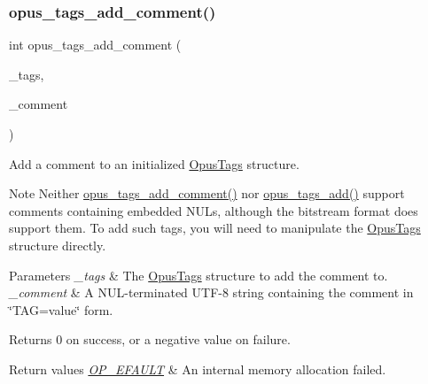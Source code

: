 \subsubsection{\texorpdfstring{opus\+\_\+tags\+\_\+add\+\_\+comment()}{opus\_tags\_add\_comment()}}
{\footnotesize\ttfamily int opus\+\_\+tags\+\_\+add\+\_\+comment (\begin{DoxyParamCaption}\item[{\hyperlink{struct_opus_tags}{Opus\+Tags} $\ast$}]{\+\_\+tags,  }\item[{\hyperlink{zconf_8h_a2c212835823e3c54a8ab6d95c652660e}{const} char $\ast$}]{\+\_\+comment }\end{DoxyParamCaption})}

Add a comment to an initialized \hyperlink{struct_opus_tags}{Opus\+Tags} structure. \begin{DoxyNote}{Note}
Neither \hyperlink{group__header__info_ga76ac5425d8c2ca9a994f84adfcc6cb98}{opus\+\_\+tags\+\_\+add\+\_\+comment()} nor \hyperlink{group__header__info_ga42bc0321740b618271c4cd0ae076d29a}{opus\+\_\+tags\+\_\+add()} support comments containing embedded N\+U\+Ls, although the bitstream format does support them. To add such tags, you will need to manipulate the \hyperlink{struct_opus_tags}{Opus\+Tags} structure directly. 
\end{DoxyNote}

\begin{DoxyParams}{Parameters}
{\em \+\_\+tags} & The \hyperlink{struct_opus_tags}{Opus\+Tags} structure to add the comment to. \\
\hline
{\em \+\_\+comment} & A N\+U\+L-\/terminated U\+T\+F-\/8 string containing the comment in \char`\"{}\+T\+A\+G=value\char`\"{} form. \\
\hline
\end{DoxyParams}
\begin{DoxyReturn}{Returns}
0 on success, or a negative value on failure. 
\end{DoxyReturn}

\begin{DoxyRetVals}{Return values}
{\em \hyperlink{group__error__codes_ga2ddb887c0bb55c74ea6be391fabcba59}{O\+P\+\_\+\+E\+F\+A\+U\+LT}} & An internal memory allocation failed. \\
\hline
\end{DoxyRetVals}
\mbox{\label{group__header__info_ga16d4f85561a965d56e0c5177fa129c35}} 
